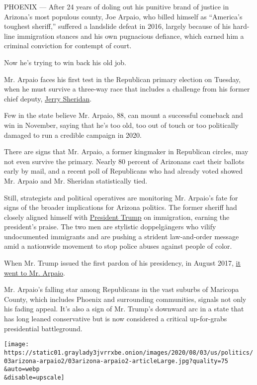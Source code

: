 PHOENIX --- After 24 years of doling out his punitive brand of justice
in Arizona's most populous county, Joe Arpaio, who billed himself as
``America's toughest sheriff,'' suffered a landslide defeat in 2016,
largely because of his hard-line immigration stances and his own
pugnacious defiance, which earned him a criminal conviction for contempt
of court.

Now he's trying to win back his old job.

Mr. Arpaio faces his first test in the Republican primary election on
Tuesday, when he must survive a three-way race that includes a challenge
from his former chief deputy,
\href{https://sheridan4sheriff2020.com/qualifications/}{Jerry Sheridan}.

Few in the state believe Mr. Arpaio, 88, can mount a successful comeback
and win in November, saying that he's too old, too out of touch or too
politically damaged to run a credible campaign in 2020.

There are signs that Mr. Arpaio, a former kingmaker in Republican
circles, may not even survive the primary. Nearly 80 percent of
Arizonans cast their ballots early by mail, and a recent poll of
Republicans who had already voted showed Mr. Arpaio and Mr. Sheridan
statistically tied.

Still, strategists and political operatives are monitoring Mr. Arpaio's
fate for signs of the broader implications for Arizona politics. The
former sheriff had closely aligned himself with
\href{https://www.nytimes3xbfgragh.onion/interactive/2020/us/elections/donald-trump.html}{President
Trump} on immigration, earning the president's praise. The two men are
stylistic doppelgängers who vilify undocumented immigrants and are
pushing a strident law-and-order message amid a nationwide movement to
stop police abuses against people of color.

When Mr. Trump issued the first pardon of his presidency, in August
2017,
\href{https://www.nytimes3xbfgragh.onion/2017/08/25/us/politics/joe-arpaio-trump-pardon-sheriff-arizona.html}{it
went to Mr. Arpaio}.

Mr. Arpaio's falling star among Republicans in the vast suburbs of
Maricopa County, which includes Phoenix and surrounding communities,
signals not only his fading appeal. It's also a sign of Mr. Trump's
downward arc in a state that has long leaned conservative but is now
considered a critical up-for-grabs presidential battleground.

\texttt{[image: https://static01.graylady3jvrrxbe.onion/images/2020/08/03/us/politics/03arizona-arpaio2/03arizona-arpaio2-articleLarge.jpg?quality=75\\\&auto=webp\\\&disable=upscale]}

